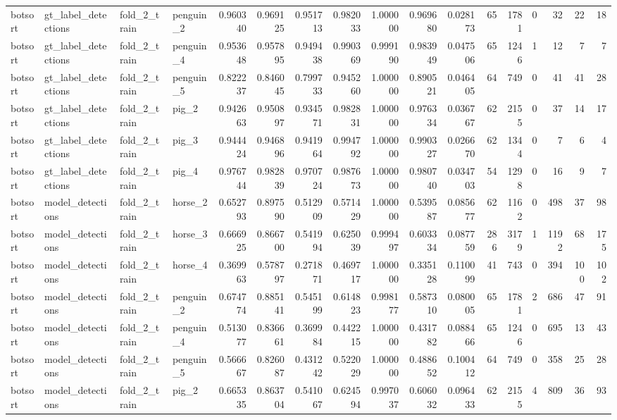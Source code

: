 \begin{table}
\begin{tabular}{llllrrrrrrrrrrrrr}
botsort & gt_label_detections & fold_2_train & penguin_2 & 0.960340 & 0.969125 & 0.951713 & 0.982033 & 1.000000 & 0.969680 & 0.028173 & 65 & 1781 & 0 & 32 & 22 & 18 \\
botsort & gt_label_detections & fold_2_train & penguin_4 & 0.953648 & 0.957895 & 0.949438 & 0.990369 & 0.999190 & 0.983949 & 0.047506 & 65 & 1246 & 1 & 12 & 7 & 7 \\
botsort & gt_label_detections & fold_2_train & penguin_5 & 0.822237 & 0.846045 & 0.799733 & 0.945260 & 1.000000 & 0.890521 & 0.046405 & 64 & 749 & 0 & 41 & 41 & 28 \\
botsort & gt_label_detections & fold_2_train & pig_2 & 0.942663 & 0.950897 & 0.934571 & 0.982831 & 1.000000 & 0.976334 & 0.036767 & 62 & 2155 & 0 & 37 & 14 & 17 \\
botsort & gt_label_detections & fold_2_train & pig_3 & 0.944424 & 0.946896 & 0.941964 & 0.994792 & 1.000000 & 0.990327 & 0.026670 & 62 & 1344 & 0 & 7 & 6 & 4 \\
botsort & gt_label_detections & fold_2_train & pig_4 & 0.976744 & 0.982839 & 0.970724 & 0.987673 & 1.000000 & 0.980740 & 0.034703 & 54 & 1298 & 0 & 16 & 9 & 7 \\
botsort & model_detections & fold_2_train & horse_2 & 0.652793 & 0.897590 & 0.512909 & 0.571429 & 1.000000 & 0.539587 & 0.085677 & 62 & 1162 & 0 & 498 & 37 & 98 \\
botsort & model_detections & fold_2_train & horse_3 & 0.666925 & 0.866700 & 0.541994 & 0.625039 & 0.999497 & 0.603334 & 0.087759 & 286 & 3179 & 1 & 1192 & 68 & 175 \\
botsort & model_detections & fold_2_train & horse_4 & 0.369963 & 0.578797 & 0.271871 & 0.469717 & 1.000000 & 0.335128 & 0.110099 & 41 & 743 & 0 & 394 & 100 & 102 \\
botsort & model_detections & fold_2_train & penguin_2 & 0.674774 & 0.885141 & 0.545199 & 0.614823 & 0.998177 & 0.587310 & 0.080005 & 65 & 1781 & 2 & 686 & 47 & 91 \\
botsort & model_detections & fold_2_train & penguin_4 & 0.513077 & 0.836661 & 0.369984 & 0.442215 & 1.000000 & 0.431782 & 0.088466 & 65 & 1246 & 0 & 695 & 13 & 43 \\
botsort & model_detections & fold_2_train & penguin_5 & 0.566667 & 0.826087 & 0.431242 & 0.522029 & 1.000000 & 0.488652 & 0.100412 & 64 & 749 & 0 & 358 & 25 & 28 \\
botsort & model_detections & fold_2_train & pig_2 & 0.665335 & 0.863704 & 0.541067 & 0.624594 & 0.997037 & 0.606032 & 0.096433 & 62 & 2155 & 4 & 809 & 36 & 93 \\

\end{tabular}
\end{table}
